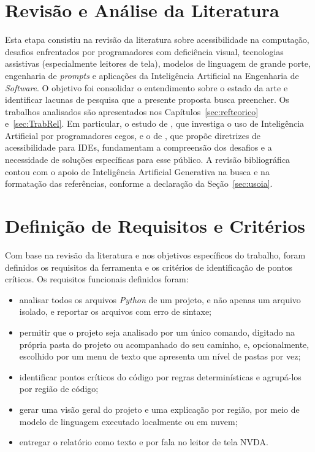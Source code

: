 \documentclass[
    12pt,                   %
    openright,              %
    oneside,                %
    a4paper,                %
    sumario=tradicional,    %
    english,                %
    brazil,                 %
    ]{abntex2}
\begin{document}
\section{Revisão e Análise da Literatura}

Esta etapa consistiu na revisão da literatura sobre acessibilidade na computação, desafios enfrentados por programadores com deficiência visual, tecnologias assistivas (especialmente leitores de tela), modelos de linguagem de grande porte, engenharia de \textit{prompts} e aplicações da Inteligência Artificial na Engenharia de \textit{Software}. O objetivo foi consolidar o entendimento sobre o estado da arte e identificar lacunas de pesquisa que a presente proposta busca preencher. Os trabalhos analisados são apresentados nos Capítulos~\ref{sec:refteorico} e~\ref{sec:TrabRel}. Em particular, o estudo de \textcite{latinoware34224}, que investiga o uso de Inteligência Artificial por programadores cegos, e o de \textcite{latinoware37693}, que propõe diretrizes de acessibilidade para IDEs, fundamentam a compreensão dos desafios e a necessidade de soluções específicas para esse público. A revisão bibliográfica contou com o apoio de Inteligência Artificial Generativa na busca e na formatação das referências, conforme a declaração da Seção~\ref{sec:usoia}.

\section{Definição de Requisitos e Critérios}\label{sec:requisitos}

Com base na revisão da literatura e nos objetivos específicos do trabalho, foram definidos os requisitos da ferramenta e os critérios de identificação de pontos críticos. Os requisitos funcionais definidos foram:

\begin{itemize}
  \item analisar todos os arquivos \textit{Python} de um projeto, e não apenas um arquivo isolado, e reportar os arquivos com erro de sintaxe;
  \item permitir que o projeto seja analisado por um único comando, digitado na própria pasta do projeto ou acompanhado do seu caminho, e, opcionalmente, escolhido por um menu de texto que apresenta um nível de pastas por vez;
  \item identificar pontos críticos do código por regras determinísticas e agrupá-los por região de código;
  \item gerar uma visão geral do projeto e uma explicação por região, por meio de modelo de linguagem executado localmente ou em nuvem;
  \item entregar o relatório como texto e por fala no leitor de tela NVDA.
\end{itemize}
\end{document}
